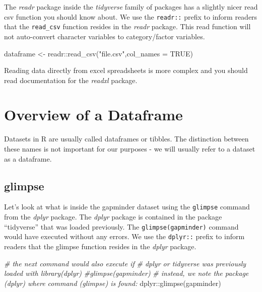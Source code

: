 \documentclass[
]{book}
\newenvironment{Shaded}{\begin{snugshade}}{\end{snugshade}}
\newcommand{\AttributeTok}[1]{\textcolor[rgb]{0.77,0.63,0.00}{#1}}
\newcommand{\CommentTok}[1]{\textcolor[rgb]{0.56,0.35,0.01}{\textit{#1}}}
\newcommand{\ConstantTok}[1]{\textcolor[rgb]{0.00,0.00,0.00}{#1}}
\newcommand{\FunctionTok}[1]{\textcolor[rgb]{0.00,0.00,0.00}{#1}}
\newcommand{\NormalTok}[1]{#1}
\newcommand{\OtherTok}[1]{\textcolor[rgb]{0.56,0.35,0.01}{#1}}
\newcommand{\SpecialCharTok}[1]{\textcolor[rgb]{0.00,0.00,0.00}{#1}}
\newcommand{\StringTok}[1]{\textcolor[rgb]{0.31,0.60,0.02}{#1}}
\begin{document}
The \emph{readr} package inside the \emph{tidyverse} family of packages has a slightly nicer read csv function you should know about. We use the \texttt{readr::} prefix to inform readers that the \texttt{read\_csv} function resides in the \emph{readr} package. This read function will not auto-convert character variables to category/factor variables.

\begin{Shaded}
\begin{Highlighting}[]
\NormalTok{dataframe }\OtherTok{\textless{}{-}}\NormalTok{ readr}\SpecialCharTok{::}\FunctionTok{read\_csv}\NormalTok{(}\StringTok{"file.csv"}\NormalTok{,}\AttributeTok{col\_names =} \ConstantTok{TRUE}\NormalTok{)}
\end{Highlighting}
\end{Shaded}

Reading data directly from excel spreadsheets is more complex and you should read documentation for the \emph{readxl} package.

\hypertarget{OverviewDataframe}{%
\chapter{Overview of a Dataframe}\label{OverviewDataframe}}

Datasets in R are usually called dataframes or tibbles. The distinction between these names is not important for our purposes - we will usually refer to a dataset as a dataframe.

\hypertarget{glimpse}{%
\section{glimpse}\label{glimpse}}

Let's look at what is inside the gapminder dataset using the \texttt{glimpse} command from the \emph{dplyr} package. The \emph{dplyr} package is contained in the package ``tidyverse'' that was loaded previously. The \texttt{glimpse(gapminder)} command would have executed without any errors. We use the \texttt{dplyr::} prefix to inform readers that the glimpse function resides in the \emph{dplyr} package.

\begin{Shaded}
\begin{Highlighting}[]
\CommentTok{\# the next command would also execute if}
\CommentTok{\# dplyr or tidyverse was previously loaded with library(dplyr)}
\CommentTok{\#glimpse(gapminder)}
\CommentTok{\# instead, we note the package (dplyr) where command (glimpse) is found:}
\NormalTok{dplyr}\SpecialCharTok{::}\FunctionTok{glimpse}\NormalTok{(gapminder)}
\end{Highlighting}
\end{Shaded}
\end{document}
